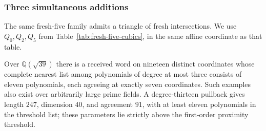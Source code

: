 \subsubsection{Three simultaneous additions}
The same fresh-five family admits a triangle of fresh intersections.  We use
$Q_0,Q_2,Q_5$ from Table~\ref{tab:fresh-five-cubics}, in the same affine
coordinate as that table.
\begin{theorem}\label{thm:eleven-cubic-padding}
Over $\mathbb Q(\sqrt{39})$ there is a received word on nineteen distinct
coordinates whose complete nearest list among polynomials of degree at most
three consists of eleven polynomials, each agreeing at exactly seven
coordinates.  Such examples also exist over arbitrarily large prime fields.
A degree-thirteen pullback gives length $247$, dimension $40$, and agreement
$91$, with at least eleven polynomials in the threshold list; these parameters
lie strictly above the first-order proximity threshold.
\end{theorem}
